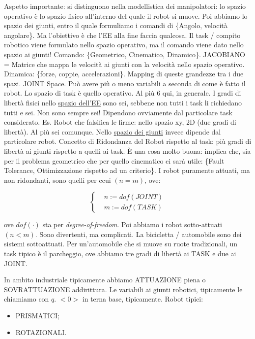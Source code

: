 Aspetto importante: si distinguono nella modellistica dei manipolatori: lo spazio operativo è lo spazio fisico all'interno del quale il robot si muove. Poi abbiamo lo spazio dei giunti, entro il quale formuliamo i comandi di \{Angolo, velocità angolare\}. Ma l'obiettivo è che l'EE alla fine faccia qualcosa. Il task / compito robotico viene formulato nello spazio operativo, ma il comando viene dato nello spazio ai giunti! Comando: \{Geometrico, Cinematico, Dinamico\}. JACOBIANO = Matrice che mappa le velocità ai giunti con la velocità nello spazio operativo. Dinamica: \{forze, coppie, accelerazioni\}. Mapping di queste grandezze tra i due spazi. JOINT Space. Può avere più o meno variabili a seconda di come è fatto il robot. Lo spazio di task è quello operativo. Al più 6 qui, in generale. I gradi di libertà fisici nello \underline{spazio dell'EE} sono sei, sebbene non tutti i task li richiedano tutti e sei. Non sono sempre sei! Dipendono ovviamente dal particolare task considerato. Es. Robot che falsifica le firme: nello spazio xy, 2D (due gradi di libertà). Al più sei comunque. Nello \underline{spazio dei giunti} invece dipende dal particolare robot. Concetto di Ridondanza del Robot rispetto al task: più gradi di libertà ai giunti rispetto a quelli ai task. \`E una cosa molto buona: implica che, sia per il problema geometrico che per quello cinematico ci sarà utile: \{Fault Tolerance, Ottimizzazione rispetto ad un criterio\}. I robot puramente attuati, ma non ridondanti, sono quelli per ccui $(n=m)$, ove: 

\[
	\left\{
	\begin{aligned}
	&n := dof(JOINT)\\
	&m := dof(TASK)
	\end{aligned}
	\right.
\]

ove $dof(\mathord{\cdot})$ sta per \textit{degree-of-freedom}. 
Poi abbiamo i robot sotto-attuati $(n<m)$. Sono divertenti, ma complicati. La bicicletta / automobile sono dei sistemi sottoattuati. Per un'automobile che si muove su ruote tradizionali, un task tipico è il parcheggio, ove abbiamo tre gradi di libertà ai TASK e due ai JOINT. 

In ambito industriale tipicamente abbiamo ATTUAZIONE piena o SOVRATTUAZIONE addirittura. Le variabili ai giunti robotici, tipicamente le chiamiamo con $q$. $<0>$ in terna base, tipicamente. Robot tipici:

\begin{itemize}
\item PRISMATICI; 
\item ROTAZIONALI.
\end{itemize}

